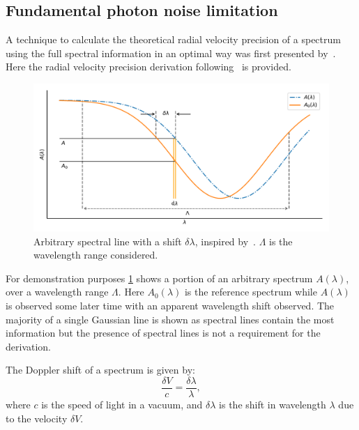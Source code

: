 

\subsection{Fundamental photon noise limitation}
\label{subsec:fundamental_precision}
A technique to calculate the theoretical radial velocity precision of a spectrum using the full spectral information in an optimal way was first presented by~\citet{connes_absolute_1985}.
Here the radial velocity precision derivation following~\citet{connes_absolute_1985, bouchy_fundamental_2001, figueira_radial_2016} is provided.

\begin{figure}
    \centering
    \includegraphics[width=0.8\linewidth]{figures/information-content/precision_plot.pdf}
    \caption[Demonstration of a shifted arbitrary spectral line.]{Arbitrary spectral line with a shift \(\delta \lambda\), inspired by~\citet{connes_absolute_1985}.
        \(\Lambda\) is the wavelength range considered.}
    \label{fig:precisionderivation}
\end{figure}

For demonstration purposes \cref{fig:precisionderivation} shows a portion of an arbitrary spectrum \(A(\lambda)\), over a wavelength range \(\Lambda\).
Here \({A}_{0}(\lambda)\) is the reference spectrum while \(A(\lambda)\) is observed some later time with an apparent wavelength shift observed.
The majority of a single Gaussian line is shown as spectral lines contain the most information but the presence of spectral lines is not a requirement for the derivation.

The Doppler shift of a spectrum is given by:
\begin{equation}
\frac{\delta V}{c} = \frac{\delta \lambda}{\lambda},
\label{eqn:dopplershift}
\end{equation}
where \(c\) is the speed of light in a vacuum, and \(\delta \lambda\) is the shift in wavelength \(\lambda\) due to the velocity \(\delta V\).

